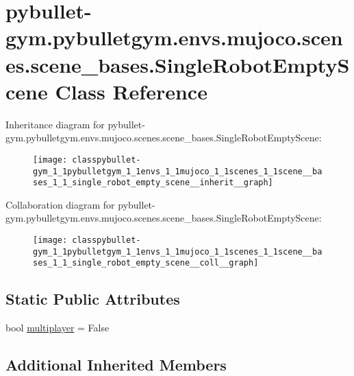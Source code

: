 \hypertarget{classpybullet-gym_1_1pybulletgym_1_1envs_1_1mujoco_1_1scenes_1_1scene__bases_1_1_single_robot_empty_scene}{}\section{pybullet-\/gym.pybulletgym.\+envs.\+mujoco.\+scenes.\+scene\+\_\+bases.\+Single\+Robot\+Empty\+Scene Class Reference}
\label{classpybullet-gym_1_1pybulletgym_1_1envs_1_1mujoco_1_1scenes_1_1scene__bases_1_1_single_robot_empty_scene}


Inheritance diagram for pybullet-\/gym.pybulletgym.\+envs.\+mujoco.\+scenes.\+scene\+\_\+bases.\+Single\+Robot\+Empty\+Scene\+:
\nopagebreak
\begin{figure}[H]
\begin{center}
\leavevmode
\texttt{[image: classpybullet-gym\_1\_1pybulletgym\_1\_1envs\_1\_1mujoco\_1\_1scenes\_1\_1scene\_\_bases\_1\_1\_single\_robot\_empty\_scene\_\_inherit\_\_graph]}
\end{center}
\end{figure}


Collaboration diagram for pybullet-\/gym.pybulletgym.\+envs.\+mujoco.\+scenes.\+scene\+\_\+bases.\+Single\+Robot\+Empty\+Scene\+:
\nopagebreak
\begin{figure}[H]
\begin{center}
\leavevmode
\texttt{[image: classpybullet-gym\_1\_1pybulletgym\_1\_1envs\_1\_1mujoco\_1\_1scenes\_1\_1scene\_\_bases\_1\_1\_single\_robot\_empty\_scene\_\_coll\_\_graph]}
\end{center}
\end{figure}
\subsection*{Static Public Attributes}
\begin{DoxyCompactItemize}
\item 
bool \hyperlink{classpybullet-gym_1_1pybulletgym_1_1envs_1_1mujoco_1_1scenes_1_1scene__bases_1_1_single_robot_empty_scene_a2e1a7a294083e6af1b20f032aebeef04}{multiplayer} = False
\end{DoxyCompactItemize}
\subsection*{Additional Inherited Members}


